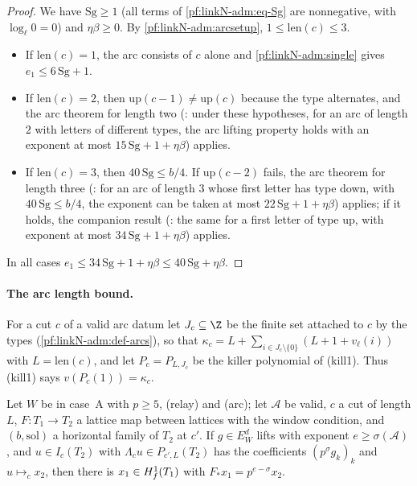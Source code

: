 \begin{proof}
We have $\mathrm{Sg}\ge1$ (all terms of \eqref{pf:linkN-adm:eq-Sg} are nonnegative, with $\log_\ell0=0$) and
$\eta\beta\ge0$. By \cref{pf:linkN-adm:arcsetup}, $1\le\mathrm{len}(c)\le3$.
\begin{itemize}
\item If $\mathrm{len}(c)=1$, the arc consists of $c$ alone and \cref{pf:linkN-adm:single} gives $e_1\le6\,\mathrm{Sg}+1$.
\item If $\mathrm{len}(c)=2$, then $\mathrm{up}(c-1)\ne\mathrm{up}(c)$ because the type alternates, and the arc theorem for
  length two (: under these hypotheses,
  for an arc of length $2$ with letters of different types, the arc lifting property holds with an exponent at most
  $15\,\mathrm{Sg}+1+\eta\beta$) applies.
\item If $\mathrm{len}(c)=3$, then $40\,\mathrm{Sg}\le b/4$. If $\mathrm{up}(c-2)$ fails, the arc theorem for length three
  (: for an arc of length $3$ whose first
  letter has type down, with $40\,\mathrm{Sg}\le b/4$, the exponent can be taken at most $22\,\mathrm{Sg}+1+\eta\beta$)
  applies; if it holds, the companion result
  (: the same for a first
  letter of type up, with exponent at most $34\,\mathrm{Sg}+1+\eta\beta$) applies.
\end{itemize}
In all cases $e_1\le34\,\mathrm{Sg}+1+\eta\beta\le40\,\mathrm{Sg}+\eta\beta$.
\end{proof}

\paragraph{The arc length bound.}
For a cut $c$ of a valid arc datum let $J_c\subseteq\Z$ be the finite set attached to $c$ by the types
(\cref{pf:linkN-adm:def-arcs}), so that $\kappa_c=L+\sum_{i\in J_c\setminus\{0\}}(L+1+v_\ell(i))$ with $L=\mathrm{len}(c)$, and
let $P_c=P_{L,J_c}$ be the killer polynomial of (kill1). Thus (kill1) says $v(P_c(1))=\kappa_c$.

\begin{lemma}\label{pf:linkN-adm:transfer}
Let $W$ be in case~A with $p\ge5$, (relay) and (arc); let $\mathcal A$ be valid, $c$ a cut of length $L$, $F\colon T_1\to T_2$
a lattice map between lattices with the window condition, and $(b,\mathrm{sol})$ a horizontal family of $T_2$ at $c'$. If
$g\in E_W^d$ lifts with exponent $e\ge\sigma(\mathcal A)$, and $u\in I_c(T_2)$ with $\Lambda_cu\in P_{c',L}(T_2)$ has the
coefficients $(p^\sigma g_k)_k$ and $u\mapsto_cx_2$, then there is $x_1\in H^1_{f}(T_1)$ with
$F_*x_1=p^{e-\sigma}x_2$.
\end{lemma}

